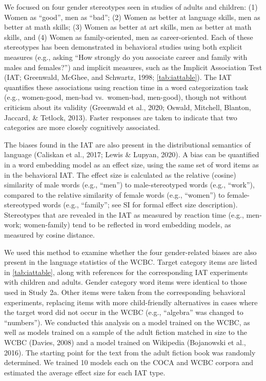 \documentclass[
  english,
  ,man,floatsintext]{apa6}
\begin{document}
We focused on four gender stereotypes seen in studies of adults and children: (1) Women as \enquote{good}, men as \enquote{bad}; (2) Women as better at language skills, men as better at math skills; (3) Women as better at art skills, men as better at math skills, and (4) Women as family-oriented, men as career-oriented. Each of these stereotypes has been demonstrated in behavioral studies using both explicit measures (e.g., asking \enquote{How strongly do you associate career and family with males and females?}) and implicit measures, such as the Implicit Association Test (IAT; Greenwald, McGhee, and Schwartz, 1998; \autoref{tab:iattable}). The IAT quantifies these associations using reaction time in a word categorization task (e.g., women-good, men-bad vs.~women-bad, men-good), though not without criticism about its validity (Greenwald et al., 2020; Oswald, Mitchell, Blanton, Jaccard, \& Tetlock, 2013). Faster responses are taken to indicate that two categories are more closely cognitively associated.

The biases found in the IAT are also present in the distributional semantics of language (Caliskan et al., 2017; Lewis \& Lupyan, 2020). A bias can be quantified in a word embedding model as an effect size, using the same set of word items as in the behavioral IAT. The effect size is calculated as the relative (cosine) similarity of male words (e.g., \enquote{men}) to male-stereotyped words (e.g., \enquote{work}), compared to the relative similarity of female words (e.g., \enquote{women}) to female-stereotyped words (e.g., \enquote{family}; see SI for formal effect size description). Stereotypes that are revealed in the IAT as measured by reaction time (e.g., men-work; women-family) tend to be reflected in word embedding models, as measured by cosine distance.

We used this method to examine whether the four gender-related biases are also present in the language statistics of the WCBC. Target category items are listed in \autoref{tab:iattable}, along with references for the corresponding IAT experiments with children and adults. Gender category word items were identical to those used in Study 2a. Other items were taken from the corresponding behavioral experiments, replacing items with more child-friendly alternatives in cases where the target word did not occur in the WCBC (e.g., \enquote{algebra} was changed to \enquote{numbers}). We conducted this analysis on a model trained on the WCBC, as well as models trained on a sample of the adult fiction matched in size to the WCBC (Davies, 2008) and a model trained on Wikipedia (Bojanowski et al., 2016). The starting point for the text from the adult fiction book was randomly determined. We trained 10 models each on the COCA and WCBC corpora and estimated the average effect size for each IAT type.
\end{document}

